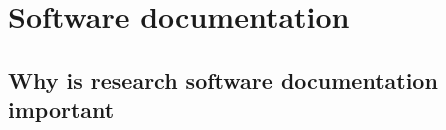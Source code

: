 \documentclass{SBCbookchapter}
\begin{document}
\section{Software documentation}

\subsection{Why is research software documentation important}



\end{document}
